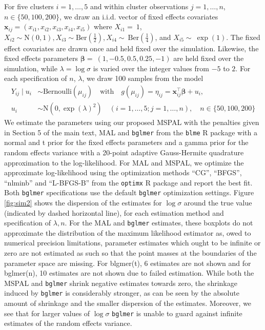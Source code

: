 \documentclass[11pt, a4paper]{article}
\newcommand*{\bb}{\boldsymbol}
\theoremstyle{example} \newtheorem{example}{Example}[section]
\theoremstyle{theorem} \newtheorem{theorem}{Theorem}[section]
\theoremstyle{theorem }\newtheorem{proposition}{Proposition}[section]
\theoremstyle{theorem }\newtheorem{corollary}{Corollary}[section]
\def\\bbeta{\bb{\\bbeta}}
\def\bx{\bb{x}}
\begin{document}
For five clusters $i=1,\ldots,5$ and within cluster observations $j=1,\ldots,n$, $n \in \{50,100,200\}$, we draw an i.i.d. vector of fixed effects covariates $\bx_{ij} = (x_{i1},x_{i2},x_{i3},x_{i4},x_{i5})$ where $X_{i1}=~1$, ${X}_{i2} \sim \text{N}(0,1), {X}_{i3}\sim \textrm{Ber}\left(\frac{1}{2}\right), {X}_{i4}\sim~\textrm{Ber}\left(\frac{1}{4}\right)$, and ${X}_{i5}\sim~\exp(1)$. The fixed effect covariates are drawn once and held fixed over the simulation. Likewise, the fixed effects parameters $\bb \beta  =~(1,-0.5,0.5,0.25,-1)$ are held fixed over the simulation, while $\lambda = \log \sigma$ is varied  over the integer values from $-5$ to $2$. For each specification of $n$, $\lambda$, we draw 100 samples from the model 
\begin{equation}
\begin{aligned}
\label{eq:sim2_model} 
Y_{ij} \mid {u}_i & \sim \text{Bernoulli}(\mu_{ij}) \quad \text{with} \quad
g(\mu_{ij}) = \eta_{ij} = \bx_{ij}^\top \bb \beta + u_i,\\
u_i & \sim \text{N}(0, \exp (\lambda)^2 )  \quad (i = 1, \ldots, 5; j = 1, \ldots, n), \quad n\in \{50,100,200\}
\end{aligned}
\end{equation}
We estimate the parameters using our proposed MSPAL with the penalties given in Section 5 of the main text, MAL and \texttt{bglmer}  from the \texttt{blme} R package \citep{blme} with a normal and t prior for the fixed effects parameters and a gamma prior for the random effects variance with a 20-point adaptive Gauss-Hermite quadrature approximation to the log-likelihood. For MAL and MSPAL, we optimize the approximate log-likelihood using the optimization methods ``CG'', ``BFGS'', ``nlminb'' and ``L-BFGS-B'' from the \texttt{optimx} R package \citep{nash+varadhan:2011} and report the best fit. Both \texttt{bglmer} specifications use the default \texttt{bglmer} optimization settings. Figure \ref{fig:sim2} shows the dispersion of the estimates for $\log \sigma$ around the true value (indicated by dashed horizontal line), for each estimation method and specification of $\lambda ,n$. For the MAL and \texttt{bglmer} estimates, these boxplots do not approximate the distribution of the maximum likelihood estimator as, owed to numerical precision limitations, parameter estimates which ought to be infinite or zero are not estimated as such so that the point masses at the boundaries of the parameter space are missing. For blgmer(t), 6 estimates are not shown and for bglmer(n), 10 estimates are not shown due to failed estimation. While both the MSPAL and \texttt{bglmer} shrink negative estimates towards zero, the shrinkage induced by \texttt{bglmer} is considerably stronger, as can be seen by the absolute amount of shrinkage and the smaller dispersion of the estimates. Moreover, we see that for larger values of $\log \sigma$ \texttt{bglmer} is unable to guard against infinite estimates of the random effects variance. 
\end{document}
